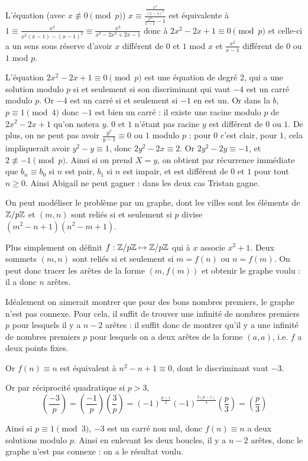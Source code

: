 \begin{sol}
L'équation (avec $x\not\equiv 0 \pmod{p}$) $ x\equiv \frac{\frac{x^4}{(x - 1)^2}}{\frac{x^2}{x - 1} - 1}$ est équivalente à $1\equiv \frac{x^3}{x^2(x - 1) - (x - 1)^2}\equiv \frac{x^3}{x^3 - 2x^2 + 2x - 1}$ donc à $2x^2 - 2x + 1\equiv 0\pmod{p}$  et celle-ci a un sens sous réserve d'avoir $x$ différent de $0$ et $1$ mod $x$ et $\frac{x^2}{x - 1}$ différent de $0$ ou $1$ mod $p$.

L'équation $2x^2 - 2x + 1\equiv 0\pmod{p}$ est une équation de degré $2$, qui a une solution modulo $p$ si et seulement si son discriminant qui vaut $-4$ est un carré modulo $p$. Or $-4$ est un carré si et seulement si $-1$ en est un. Or dans la $b$, $p\equiv 1\pmod{4}$ donc $-1$ est bien un carré : il existe une racine modulo $p$ de $2x^2 - 2x + 1$ qu'on notera $y$. $0$ et $1$ n'étant pas racine $y$ est différent de $0$ ou $1$. De plus, on ne peut pas avoir $\frac{y^2}{y - 1}\equiv 0$ ou $1$ modulo $p$ : pour $0$ c'est clair, pour $1$, cela impliquerait avoir $y^2 - y\equiv 1$, donc $2y^2 - 2x\equiv 2$. Or $2y^2 - 2y\equiv -1$, et $2\not \equiv -1 \pmod{p}$. Ainsi si on prend $X=y$, on obtient par récurrence immédiate que $b_n\equiv b_0$ si $n$ est pair, $b_1$ si $n$ est impair, et est différent de $0$ et $1$ pour tout $n\geq 0$. Ainsi Abigail ne peut gagner : dans les deux cas Tristan gagne.
\end{sol}

\begin{sol}
On peut modéliser le problème par un graphe, dont les villes sont les éléments de $\mathbb Z/p\mathbb Z$ et $(m,n)$ sont reliés si et seulement si $p$ divise $(m^2 - n + 1)(n^2 - m + 1)$.

Plus simplement on définit $f : \mathbb Z/p\mathbb Z\mapsto \mathbb Z/p\mathbb Z$ qui à $x$ associe $x^2 + 1$. Deux sommets $(m,n)$ sont reliés si et seulement si $m=f(n)$ ou $n=f(m)$. On peut donc tracer les arêtes de la forme $(m,f(m))$ et obtenir le graphe voulu : il a donc $n$ arêtes.

Idéalement on aimerait montrer que pour des bons nombres premiers, le graphe n'est pas connexe. Pour cela, il suffit de trouver une infinité de nombres premiers $p$ pour lesquels il y a $n - 2$ arêtes : il suffit donc de montrer qu'il y a une infinité de nombres premiers $p$ pour lesquels on a deux arêtes de la forme $(a,a)$, i.e. $f$ a deux points fixes.


Or $f(n)\equiv n$ est équivalent à $n^2 - n + 1\equiv 0$, dont le discriminant vaut $-3$.

Or par réciprocité quadratique si $p>3$,  $$\left(\dfrac{-3}{p}\right)=\left(\dfrac{-1}{p}\right)\left(\dfrac{3}{p}\right)=(-1)^{\frac{p-1}{2}}(-1)^{\frac{2(p-1)}{4}}\left(\dfrac{p}{3}\right)=\left(\dfrac{p}{3}\right)$$

Ainsi si $p\equiv 1\pmod{3}$, $-3$ est un carré non nul, donc $f(n)\equiv n$ a deux solutions modulo $p$. Ainsi en enlevant les deux boucles, il y a $n - 2$ arêtes, donc le graphe n'est pas connexe : on a le résultat voulu.
\end{sol}

